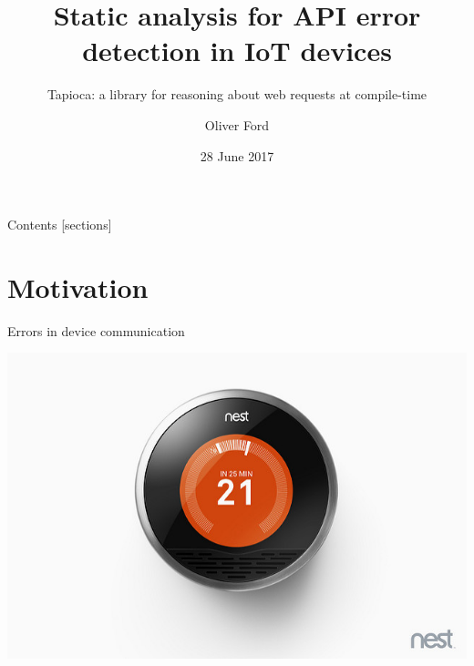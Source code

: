 \documentclass[10pt]{beamer}
\title{Static analysis for API error detection in IoT devices}
\subtitle{Tapioca: a library for reasoning about web requests at compile-time}
\date{28 June 2017}
\author{Oliver Ford}
\institute{Imperial College London}
\begin{document}

{
\maketitle
}

\begin{frame}{Contents}
  [sections]
  \tableofcontents[hideallsubsections]
\end{frame}

\section{Motivation}

\begin{frame}{Errors in device communication}

    \includegraphics[width=\textwidth]{images/nest}

\end{frame}
\end{document}
